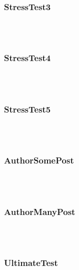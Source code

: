 \begin{description}
\subsubsection{StressTest3}
\\
\\


\subsubsection{StressTest4}
\\
\\


\subsubsection{StressTest5}
\\
\\


\subsubsection{AuthorSomePost}
\\
\\


\subsubsection{AuthorManyPost}
\\
\\


\subsubsection{UltimateTest}
\\
\\



\end{description}

